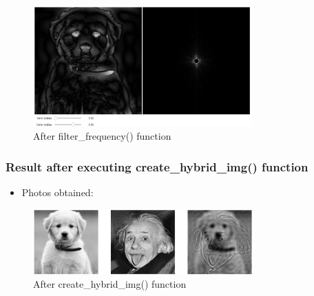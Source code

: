 \documentclass{article}
\begin{document}
\begin{figure}[H]
    \centering
    \includegraphics[width=0.75\textwidth]{ex23_output}
    \caption{After filter\_frequency() function}
    \label{ex23_output}
\end{figure}


\subsubsection{Result after executing create\_hybrid\_img() function}
\begin{itemize}
    \item Photos obtained:
\end{itemize}

\begin{figure}[H]
    \centering
    \includegraphics[width=0.75\textwidth]{ex24_output}
    \caption{After create\_hybrid\_img() function}
    \label{ex24_output}
\end{figure}
\end{document}

